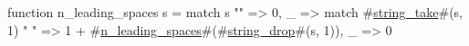 function n_leading_spaces s =
  match s {
    "" => 0,
    _ => match #\hyperref[sailRISCVzstringzytake]{string\_take}#(s, 1) {
      " " => 1 + #\hyperref[sailRISCVznzyleadingzyspaces]{n\_leading\_spaces}#(#\hyperref[sailRISCVzstringzydrop]{string\_drop}#(s, 1)),
      _ => 0
    }
  }
